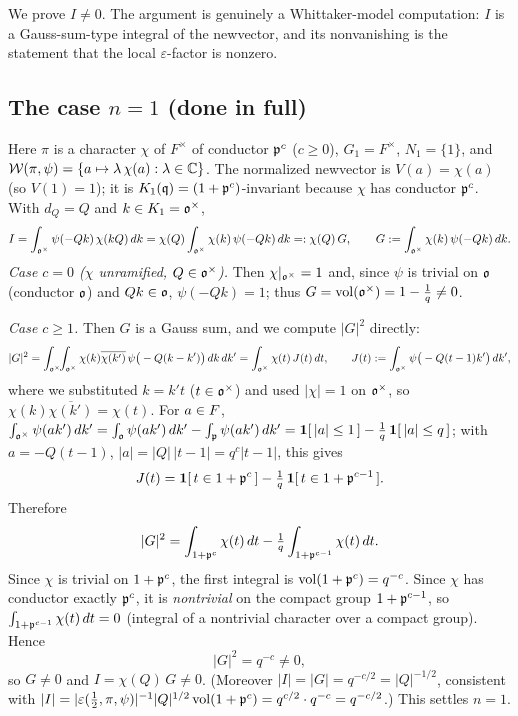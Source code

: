 We prove $I\neq0$. The argument is genuinely a Whittaker-model computation: $I$ is a
Gauss-sum-type integral of the newvector, and its nonvanishing is the statement that the local
$\varepsilon$-factor is nonzero.

\subsection*{The case $n=1$ \textup{(}done in full\textup{)}}
Here $\pi$ is a character $\chi$ of $F^\times$ of conductor $\mathfrak{p}^{c}$ \textup{(}$c\ge0$\textup{)},
$G_1=F^\times$, $N_1=\{1\}$, and $\mathcal{W}(\pi,\psi)=\{a\mapsto \lambda\,\chi(a):\lambda\in\mathbb{C}\}$.
The normalized newvector is $V(a)=\chi(a)$ \textup{(}so $V(1)=1$\textup{)}; it is
$K_1(\mathfrak{q})=(1+\mathfrak{p}^{c})$-invariant because $\chi$ has conductor $\mathfrak{p}^{c}$. With
$d_Q=Q$ and $k\in K_1=\mathfrak{o}^\times$,
\[
I=\int_{\mathfrak{o}^\times}\psi(-Q k)\,\chi(kQ)\,dk
=\chi(Q)\int_{\mathfrak{o}^\times}\chi(k)\,\psi(-Q k)\,dk
=:\chi(Q)\,G,\qquad G:=\int_{\mathfrak{o}^\times}\chi(k)\,\psi(-Q k)\,dk .
\]
\emph{Case $c=0$ \textup{(}$\chi$ unramified, $Q\in\mathfrak{o}^\times$\textup{)}.} Then
$\chi|_{\mathfrak{o}^\times}=1$ and, since $\psi$ is trivial on $\mathfrak{o}$ \textup{(}conductor
$\mathfrak{o}$\textup{)} and $Qk\in\mathfrak{o}$, $\psi(-Qk)=1$; thus
$G=\operatorname{vol}(\mathfrak{o}^\times)=1-\tfrac1q\neq0$.

\emph{Case $c\ge1$.} Then $G$ is a Gauss sum, and we compute $|G|^2$ directly:
\[
|G|^2=\int_{\mathfrak{o}^\times}\!\!\int_{\mathfrak{o}^\times}\chi(k)\overline{\chi(k')}\,
\psi\big(-Q(k-k')\big)\,dk\,dk'
=\int_{\mathfrak{o}^\times}\chi(t)\,J(t)\,dt,\qquad
J(t):=\int_{\mathfrak{o}^\times}\psi\big(-Q(t-1)k'\big)\,dk',
\]
where we substituted $k=k't$ \textup{(}$t\in\mathfrak{o}^\times$\textup{)} and used $|\chi|=1$ on
$\mathfrak{o}^\times$, so $\chi(k)\overline{\chi(k')}=\chi(t)$. For $a\in F$,
$\int_{\mathfrak{o}^\times}\psi(ak')\,dk'=\int_{\mathfrak{o}}\psi(ak')\,dk'-\int_{\mathfrak{p}}\psi(ak')\,dk'
=\mathbf 1[\,|a|\le1\,]-\tfrac1q\,\mathbf 1[\,|a|\le q\,]$; with $a=-Q(t-1)$, $|a|=|Q|\,|t-1|=q^{c}|t-1|$,
this gives
\[
J(t)=\mathbf 1[\,t\in1+\mathfrak{p}^{c}\,]-\tfrac1q\,\mathbf 1[\,t\in1+\mathfrak{p}^{c-1}\,].
\]
Therefore
\[
|G|^2=\int_{1+\mathfrak{p}^{c}}\chi(t)\,dt-\tfrac1q\int_{1+\mathfrak{p}^{c-1}}\chi(t)\,dt .
\]
Since $\chi$ is trivial on $1+\mathfrak{p}^{c}$, the first integral is
$\operatorname{vol}(1+\mathfrak{p}^{c})=q^{-c}$. Since $\chi$ has conductor exactly $\mathfrak{p}^{c}$, it is
\emph{nontrivial} on the compact group $1+\mathfrak{p}^{c-1}$, so $\int_{1+\mathfrak{p}^{c-1}}\chi(t)\,dt=0$
\textup{(}integral of a nontrivial character over a compact group\textup{)}. Hence
\[
|G|^2=q^{-c}\neq0,
\]
so $G\neq0$ and $I=\chi(Q)\,G\neq0$. \textup{(}Moreover $|I|=|G|=q^{-c/2}=|Q|^{-1/2}$, consistent
with $|I|=|\varepsilon(\tfrac12,\pi,\psi)|^{-1}|Q|^{1/2}\operatorname{vol}(1+\mathfrak{p}^{c})=q^{c/2}\cdot
q^{-c}=q^{-c/2}$.\textup{)} This settles $n=1$.

